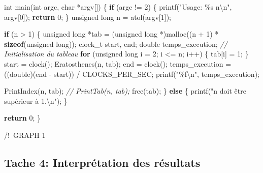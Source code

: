 \documentclass[
    ]{article}
\newenvironment{Shaded}{}{}
\newcommand{\CommentTok}[1]{\textcolor[rgb]{0.38,0.63,0.69}{\textit{#1}}}
\newcommand{\ControlFlowTok}[1]{\textcolor[rgb]{0.00,0.44,0.13}{\textbf{#1}}}
\newcommand{\DataTypeTok}[1]{\textcolor[rgb]{0.56,0.13,0.00}{#1}}
\newcommand{\DecValTok}[1]{\textcolor[rgb]{0.25,0.63,0.44}{#1}}
\newcommand{\KeywordTok}[1]{\textcolor[rgb]{0.00,0.44,0.13}{\textbf{#1}}}
\newcommand{\NormalTok}[1]{#1}
\newcommand{\SpecialCharTok}[1]{\textcolor[rgb]{0.25,0.44,0.63}{#1}}
\newcommand{\StringTok}[1]{\textcolor[rgb]{0.25,0.44,0.63}{#1}}
\begin{document}
\begin{Shaded}
\begin{Highlighting}[]
\DataTypeTok{int}\NormalTok{ main(}\DataTypeTok{int}\NormalTok{ argc, }\DataTypeTok{char}\NormalTok{ *argv[])}
\NormalTok{\{}
    \ControlFlowTok{if}\NormalTok{ (argc != }\DecValTok{2}\NormalTok{)}
\NormalTok{    \{}
\NormalTok{        printf(}\StringTok{"Usage: \%s n}\SpecialCharTok{\textbackslash{}n}\StringTok{"}\NormalTok{, argv[}\DecValTok{0}\NormalTok{]);}
        \ControlFlowTok{return} \DecValTok{0}\NormalTok{;}
\NormalTok{    \}}
    \DataTypeTok{unsigned} \DataTypeTok{long}\NormalTok{ n = atol(argv[}\DecValTok{1}\NormalTok{]);}

    \ControlFlowTok{if}\NormalTok{ (n \textgreater{} }\DecValTok{1}\NormalTok{)}
\NormalTok{    \{}
        \DataTypeTok{unsigned} \DataTypeTok{long}\NormalTok{ *tab = (}\DataTypeTok{unsigned} \DataTypeTok{long}\NormalTok{ *)malloc((n + }\DecValTok{1}\NormalTok{) * }\KeywordTok{sizeof}\NormalTok{(}\DataTypeTok{unsigned} \DataTypeTok{long}\NormalTok{));}
\NormalTok{        clock\_t start, end;}
        \DataTypeTok{double}\NormalTok{ temps\_execution;}
        \CommentTok{// Initialisation du tableau}
        \ControlFlowTok{for}\NormalTok{ (}\DataTypeTok{unsigned} \DataTypeTok{long}\NormalTok{ i = }\DecValTok{2}\NormalTok{; i \textless{}= n; i++)}
\NormalTok{        \{}
\NormalTok{            tab[i] = }\DecValTok{1}\NormalTok{;}
\NormalTok{        \}}
\NormalTok{        start = clock();}
\NormalTok{        Eratosthenes(n, tab);}
\NormalTok{        end = clock();}
\NormalTok{        temps\_execution = ((}\DataTypeTok{double}\NormalTok{)(end {-} start)) / CLOCKS\_PER\_SEC;}
\NormalTok{        printf(}\StringTok{"\%f}\SpecialCharTok{\textbackslash{}n}\StringTok{"}\NormalTok{, temps\_execution);}

\NormalTok{        PrintIndex(n, tab);}
        \CommentTok{// PrintTab(n, tab);}
\NormalTok{        free(tab);}
\NormalTok{    \}}
    \ControlFlowTok{else}
\NormalTok{    \{}
\NormalTok{        printf(}\StringTok{"n doit être supérieur à 1.}\SpecialCharTok{\textbackslash{}n}\StringTok{"}\NormalTok{);}
\NormalTok{    \}}

    \ControlFlowTok{return} \DecValTok{0}\NormalTok{;}
\NormalTok{\}}
\end{Highlighting}
\end{Shaded}
\pagebreak

/!~GRAPH 1\\
\pagebreak 

\hypertarget{tache-4-interpruxe9tation-des-ruxe9sultats}{%
\subsection{Tache 4: Interprétation des
résultats}\label{tache-4-interpruxe9tation-des-ruxe9sultats}}
\end{document}
